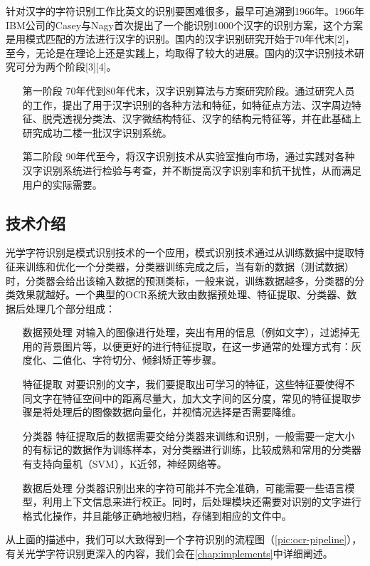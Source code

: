 针对汉字的字符识别工作比英文的识别要困难很多，最早可追溯到1966年。1966年IBM公司的Casey与Nagy首次提出了一个能识别1000个汉字的识别方案，这个方案是用模式匹配的方法进行汉字的识别。国内的汉字识别研究开始于70年代末[2]，至今，无论是在理论上还是实践上，均取得了较大的进展。国内的汉字识别技术研究可分为两个阶段[3][4]。
\begin{itemize}
	\item[第一阶段] 70年代到80年代末，汉字识别算法与方案研究阶段。通过研究人员的工作，提出了用于汉字识别的各种方法和特征，如特征点方法、汉字周边特征、脱壳透视分类法、汉字微结构特征、汉字的结构元特征等，并在此基础上研究成功二楼一批汉字识别系统。
	\item[第二阶段] 90年代至今，将汉字识别技术从实验室推向市场，通过实践对各种汉字识别系统进行检验与考查，并不断提高汉字识别率和抗干扰性，从而满足用户的实际需要。
\end{itemize}

\subsection{技术介绍}
光学字符识别是模式识别技术的一个应用，模式识别技术通过从训练数据中提取特征来训练和优化一个分类器，分类器训练完成之后，当有新的数据（测试数据）时，分类器会给出该输入数据的预测类标，一般来说，训练数据越多，分类器的分类效果就越好。一个典型的OCR系统大致由数据预处理、特征提取、分类器、数据后处理几个部分组成：
\begin{itemize}
	\item[数据预处理] 对输入的图像进行处理，突出有用的信息（例如文字），过滤掉无用的背景图片等，以便更好的进行特征提取，在这一步通常的处理方式有：灰度化、二值化、字符切分、倾斜矫正等步骤。
	\item[特征提取] 对要识别的文字，我们要提取出可学习的特征，这些特征要使得不同文字在特征空间中的距离尽量大，加大文字间的区分度，常见的特征提取步骤是将处理后的图像数据向量化，并视情况选择是否需要降维。
	\item[分类器] 特征提取后的数据需要交给分类器来训练和识别，一般需要一定大小的有标记的数据作为训练样本，对分类器进行训练，比较成熟和常用的分类器有支持向量机（SVM），K近邻，神经网络等。
	\item[数据后处理] 分类器识别出来的字符可能并不完全准确，可能需要一些语言模型，利用上下文信息来进行校正。同时，后处理模块还需要对识别的文字进行格式化操作，并且能够正确地被归档，存储到相应的文件中。
\end{itemize}
从上面的描述中，我们可以大致得到一个字符识别的流程图（\autoref{pic:ocr-pipeline}），有关光学字符识别更深入的内容，我们会在\autoref{chap:implements}中详细阐述。

